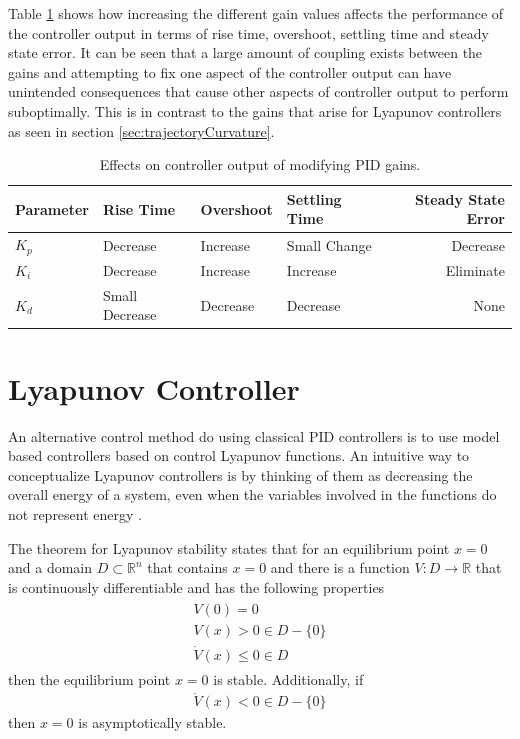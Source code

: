 Table \ref{tab:PIDGainEffects} shows how increasing the different gain values affects the performance of the controller output in terms of rise time, overshoot, settling time and steady state error. It can be seen that a large amount of coupling exists between the gains and attempting to fix one aspect of the controller output can have unintended consequences that cause other aspects of controller output to perform suboptimally. This is in contrast to the gains that arise for Lyapunov controllers as seen in section \ref{sec:trajectoryCurvature}.

\begin{table}[ht!]
\caption{Effects on controller output of modifying PID gains.}
\small
\centering
\begin{tabular}{@{}llllr@{}} \toprule
Parameter    & Rise Time      & Overshoot & Settling Time & Steady State Error \\ \midrule
$K_p$        & Decrease       & Increase  & Small Change  & Decrease \\
$K_i$        & Decrease       & Increase  & Increase      & Eliminate \\
$K_d$        & Small Decrease & Decrease  & Decrease      & None \\ \bottomrule
\end{tabular}
\label{tab:PIDGainEffects}
\end{table}

\section{Lyapunov Controller}
\label{sec:lyapunov}
An alternative control method do using classical PID controllers is to use model based controllers based on control Lyapunov functions. An intuitive way to conceptualize Lyapunov controllers is by thinking of them as decreasing the overall energy of a system, even when the variables involved in the functions do not represent energy \cite{Khalil02}.

The theorem for Lyapunov stability states that for an equilibrium point $x=0$ and a domain $D\subset\mathbb{R}^n$ that contains $x=0$ and there is a function $V:D\to\mathbb{R}$ that is continuously differentiable and has the following properties 
\begin{align*}
\begin{split}
V(0) = 0 \\
V(x) > 0 \in D-\{0\} \\
\dot{V}(x) \leq 0 \in D
\end{split}
\end{align*}
then the equilibrium point $x=0$ is stable. Additionally, if
\begin{align*}
\dot{V}(x) < 0 \in D - \{0\}
\end{align*}
then $x=0$ is asymptotically stable.

